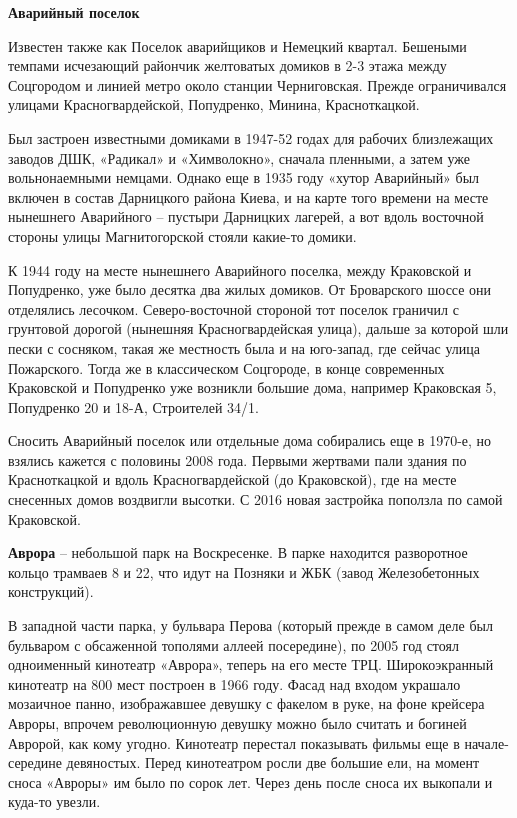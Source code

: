 \medskip

\newpage

\textbf{Аварийный поселок}

Известен также как Поселок аварийщиков и Немецкий квартал. Бешеными темпами исчезающий райончик желтоватых домиков в 2-3 этажа между Соцгородом и линией метро около станции Черниговская. Прежде ограничивался улицами Красногвардейской, Попудренко, Минина, Красноткацкой. 

Был застроен известными домиками в 1947-52 годах для рабочих близлежащих заводов ДШК, «Радикал» и «Химволокно», сначала пленными, а затем уже вольнонаемными немцами. Однако еще в 1935 году «хутор Аварийный» был включен в состав Дарницкого района Киева, и на карте того времени на месте нынешнего Аварийного – пустыри Дарницких лагерей, а вот вдоль восточной стороны улицы Магнитогорской стояли какие-то домики. 

К 1944 году на месте нынешнего Аварийного поселка, между Краковской и Попудренко, уже было десятка два жилых домиков. От Броварского шоссе они отделялись лесочком. Северо-восточной стороной тот поселок граничил с грунтовой дорогой (нынешняя Красногвардейская улица), дальше за которой шли пески с сосняком, такая же местность была и на юго-запад, где сейчас улица Пожарского. Тогда же в классическом Соцгороде, в конце современных Краковской и Попудренко уже возникли большие дома, например Краковская 5, Попудренко 20 и 18-А, Строителей 34/1.

Сносить Аварийный поселок или отдельные дома собирались еще в 1970-е, но взялись кажется с половины 2008 года. Первыми жертвами пали здания по Красноткацкой и вдоль Красногвардейской (до Краковской), где на месте снесенных домов воздвигли высотки. С 2016 новая застройка поползла по самой Краковской.\\

\medskip

\textbf{Аврора} – небольшой парк на Воскресенке. В парке находится разворотное кольцо трамваев 8 и 22, что идут на Позняки и ЖБК (завод Железобетонных конструкций).

В западной части парка, у бульвара Перова (который прежде в самом деле был бульваром с обсаженной тополями аллеей посередине), по 2005 год стоял одноименный кинотеатр «Аврора», теперь на его месте ТРЦ. Широкоэкранный кинотеатр на 800 мест построен в 1966 году. Фасад над входом украшало мозаичное панно, изображавшее девушку с факелом в руке, на фоне крейсера Авроры, впрочем революционную девушку можно было считать и богиней Авророй, как кому угодно. Кинотеатр перестал показывать фильмы еще в начале-середине девяностых. Перед кинотеатром росли две большие ели, на момент сноса «Авроры» им было по сорок лет. Через день после сноса их выкопали и куда-то увезли.

